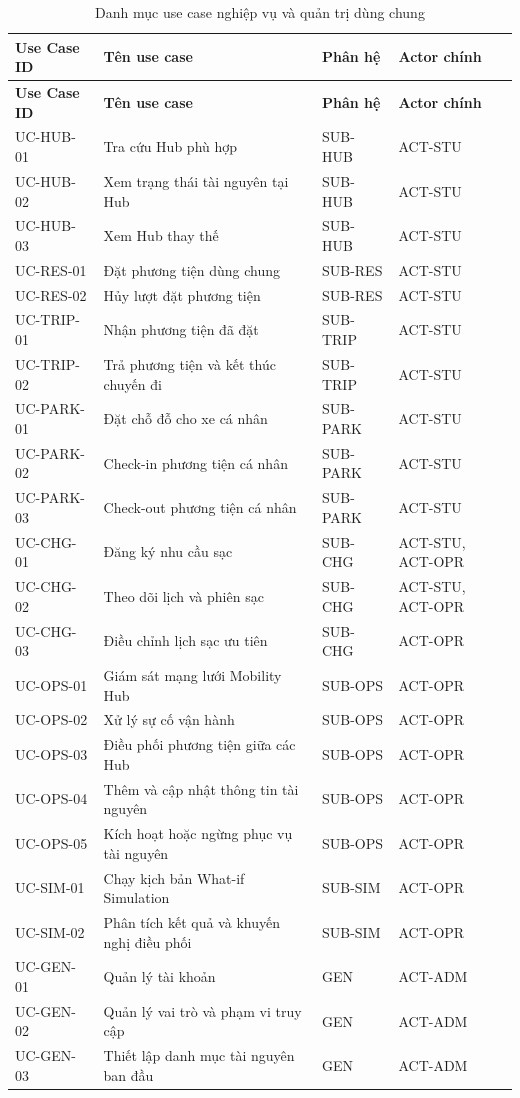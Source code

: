 \begin{longtable}{|L{26mm}|L{58mm}|L{25mm}|L{25mm}|}
  \caption{Danh mục use case nghiệp vụ và quản trị dùng chung}\label{tab:system-use-cases}\\
  \hline
  \textbf{Use Case ID} & \centering\arraybackslash\textbf{Tên use case} & \textbf{Phân hệ} & \textbf{Actor chính}\\
  \hline
  \endfirsthead
  \hline
  \textbf{Use Case ID} & \centering\arraybackslash\textbf{Tên use case} & \textbf{Phân hệ} & \textbf{Actor chính}\\
  \hline
  \endhead
  UC-HUB-01 & Tra cứu Hub phù hợp & SUB-HUB & ACT-STU\\\hline
  UC-HUB-02 & Xem trạng thái tài nguyên tại Hub & SUB-HUB & ACT-STU\\\hline
  UC-HUB-03 & Xem Hub thay thế & SUB-HUB & ACT-STU\\\hline
  UC-RES-01 & Đặt phương tiện dùng chung & SUB-RES & ACT-STU\\\hline
  UC-RES-02 & Hủy lượt đặt phương tiện & SUB-RES & ACT-STU\\\hline
  UC-TRIP-01 & Nhận phương tiện đã đặt & SUB-TRIP & ACT-STU\\\hline
  UC-TRIP-02 & Trả phương tiện và kết thúc chuyến đi & SUB-TRIP & ACT-STU\\\hline
  UC-PARK-01 & Đặt chỗ đỗ cho xe cá nhân & SUB-PARK & ACT-STU\\\hline
  UC-PARK-02 & Check-in phương tiện cá nhân & SUB-PARK & ACT-STU\\\hline
  UC-PARK-03 & Check-out phương tiện cá nhân & SUB-PARK & ACT-STU\\\hline
  UC-CHG-01 & Đăng ký nhu cầu sạc & SUB-CHG & ACT-STU, ACT-OPR\\\hline
  UC-CHG-02 & Theo dõi lịch và phiên sạc & SUB-CHG & ACT-STU, ACT-OPR\\\hline
  UC-CHG-03 & Điều chỉnh lịch sạc ưu tiên & SUB-CHG & ACT-OPR\\\hline
  UC-OPS-01 & Giám sát mạng lưới Mobility Hub & SUB-OPS & ACT-OPR\\\hline
  UC-OPS-02 & Xử lý sự cố vận hành & SUB-OPS & ACT-OPR\\\hline
  UC-OPS-03 & Điều phối phương tiện giữa các Hub & SUB-OPS & ACT-OPR\\\hline
  UC-OPS-04 & Thêm và cập nhật thông tin tài nguyên & SUB-OPS & ACT-OPR\\\hline
  UC-OPS-05 & Kích hoạt hoặc ngừng phục vụ tài nguyên & SUB-OPS & ACT-OPR\\\hline
  UC-SIM-01 & Chạy kịch bản What-if Simulation & SUB-SIM & ACT-OPR\\\hline
  UC-SIM-02 & Phân tích kết quả và khuyến nghị điều phối & SUB-SIM & ACT-OPR\\\hline
  UC-GEN-01 & Quản lý tài khoản & GEN & ACT-ADM\\\hline
  UC-GEN-02 & Quản lý vai trò và phạm vi truy cập & GEN & ACT-ADM\\\hline
  UC-GEN-03 & Thiết lập danh mục tài nguyên ban đầu & GEN & ACT-ADM\\\hline
\end{longtable}

